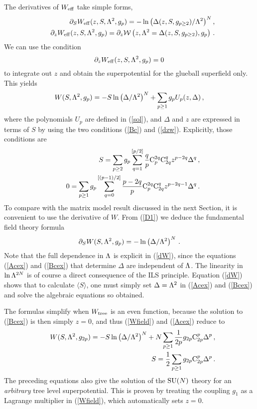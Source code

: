 \documentclass[a4paper,12pt]{article}
\def\suN{{\rm SU}(N)}
\def\wt{W_{\rm tree}}\def\weff{W_{\rm eff}}\def\ww{{\cal W}}
\def\C{{\rm C}}\def\F{{\cal F}}
\begin{document}
The derivatives of $\weff$ take simple forms,
%
\begin{eqnarray}
&& \partial_{S}\weff (z,S,\L^{2},g_{p}) = - \ln 
\left( \Delta (z,S,g_{p\geq 2})/\L^{2}\right)^{N} ,\label{D1}\\
&& \partial_{z}\weff (z,S,\L^{2},g_{p}) = \partial_{z} 
\ww \left(z,\L^{2}=\Delta (z,S,g_{p\geq 2}),g_{p}\right)\, .\label{D2}
\end{eqnarray}
%
We can use the condition
%
\begin{equation}
\label{dzw}
\partial_{z}\weff (z,S,\L^{2},g_{p}) = 0
\end{equation}
%
to integrate out $z$ and obtain the 
superpotential for the glueball superfield only. This yields
%
\begin{equation}
\label{Wfield}
W(S,\Lambda^{2},g_{p}) = -S\ln \left( \Delta /\Lambda^{2}\right)^{N} +
\sum_{p\geq 1} g_{p}U_{p}(z,\Delta )\, ,
\end{equation}
%
where the polynomials $U_{p}$ are defined in (\ref{sol}), and $\Delta$ and 
$z$ are expressed in terms of $S$ by using the two conditions 
(\ref{Bc}) and (\ref{dzw}). Explicitly, those conditions are
%
\begin{eqnarray}
&& S = \sum_{p\geq 2} 
g_{p}\sum_{q=1}^{[p/2]}{q\over p}\C_{p}^{2q}\C_{2q}^{q} z^{p-2q}
\Delta^{q}\, ,\label{Acex}\\
&& 0 = \sum_{p\geq 1} 
g_{p}\sum_{q=0}^{[(p-1)/2]}{p-2q\over p}\C_{p}^{2q}\C_{2q}^{q}
z^{p-2q-1} \Delta^{q}\, .\label{Bcex}
\end{eqnarray}
%
To compare with the matrix model result discussed in the next Section, 
it is convenient to use the derivative of $W$. From (\ref{D1}) we 
deduce the fundamental field theory formula
%
\begin{equation}
\label{dW}
\partial_{S}W(S,\Lambda^{2},g_{p}) = -\ln\left(\Delta /\Lambda^{2}\right)^{N}\, .
\end{equation}
%
Note that the full dependence in $\Lambda$ is explicit in (\ref{dW}), since the
equations (\ref{Acex}) and (\ref{Bcex}) that determine $\Delta$ are
independent of $\Lambda$. The linearity in $\ln\Lambda^{2N}$ is of course a direct
consequence of the ILS principle. Equation (\ref{dW}) shows that to
calculate $\langle S\rangle$, one must simply set $\Delta=\Lambda^{2}$ in
(\ref{Acex}) and (\ref{Bcex}) and solve the algebraic equations so
obtained.

The formulas simplify when $\wt$ is an even function, because  
the solution to (\ref{Bcex}) is then simply $z=0$, and thus (\ref{Wfield}) 
and (\ref{Acex}) reduce to
%
\begin{eqnarray}
&& W(S,\L^{2},g_{2p}) = -S\ln \left( \Delta /\L^{2}\right)^{N} +
N\sum_{p\geq 1}{1\over 2p} g_{2p}\C_{2p}^{p}\Delta^{p}\, ,\label{even1}\\
&& S = {1\over 2}\sum_{p\geq 1} g_{2p} \C_{2p}^{p}\Delta^{p}\,
.\label{even2}
\end{eqnarray}
%
The preceding equations also give the solution of the $\suN$ theory for 
an {\it arbitrary} tree level superpotential. This is proven by 
treating the coupling $g_{1}$ as a Lagrange multiplier in (\ref{Wfield}),
which automatically sets $z=0$.
\end{document}
